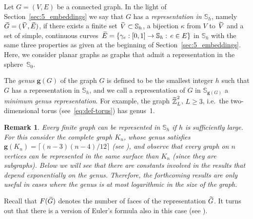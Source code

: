 \documentclass{dis}
\newtheorem{remark}[theorem]{Remark}
\theoremstyle{citing}
\begin{document}
Let $G=(V,E)$ be a connected graph. 
In the light of Section~\ref{sec:5_embeddings} we say 
that $G$ has a \emph{representation in ${\ensuremath{\mathbb{S}}}_h$}, 
namely ${\,\raisebox{2pt}{ ${\widetilde{{}}}$ }\mkern-15mu G}=({\,\raisebox{2pt}{ ${\widetilde{{}}}$ }\mkern-13mu V},{\,\raisebox{2pt}{ ${\widetilde{{}}}$ }\mkern-15mu E})$, 
if there exists a finite set ${\,\raisebox{2pt}{ ${\widetilde{{}}}$ }\mkern-13mu V}\subset{\ensuremath{\mathbb{S}}}_h$, 
a bijection $\kappa$ from $V$ to ${\,\raisebox{2pt}{ ${\widetilde{{}}}$ }\mkern-13mu V}$ 
and a set of simple, continuous curves
$\,{\,\raisebox{2pt}{ ${\widetilde{{}}}$ }\mkern-15mu E}=\{{\gamma}_e:[0,1]\to{\ensuremath{\mathbb{S}}}_h:\, e\in E\}$ in ${\ensuremath{\mathbb{S}}}_h$ 
with the same three properties as given at the beginning of 
Section~\ref{sec:5_embeddings}. 
Here, we consider planar graphs as graphs 
that admit a representation in the sphere~${\ensuremath{\mathbb{S}}}_0$.

The \emph{genus} 
${\ensuremath{\mathbf{g}}}(G)$ of the graph $G$ 
is defined to be the smallest integer $h$ such that 
$G$ has a representation in ${\ensuremath{\mathbb{S}}}_h$, and we call a 
representation of $G$ in ${\ensuremath{\mathbb{S}}}_{{\ensuremath{\mathbf{g}}}(G)}$ a 
\emph{minimum genus representation}. 
For example, the graph ${\raisebox{2pt}{ ${\widetilde{{}}}$ }\mkern-12mu {\ensuremath{\mathbb{Z}}}}_L^2$, $L\ge3$, 
i.e.~the two-dimensional torus 
(see~\eqref{eq:def-torus}) has genus~1.

\begin{remark}
Every finite graph can be represented in ${\ensuremath{\mathbb{S}}}_h$ 
if $h$ is sufficiently large. For this consider the 
complete graph $K_n$, whose genus satisfies
${\ensuremath{\mathbf{g}}}(K_n)=\lceil{(n-3)(n-4)}/{12}\rceil$ 
(see \cite{Ringel-Youngs}), 
and observe that 
every graph on $n$ vertices can be represented in 
the same surface than $K_n$ (since they are subgraphs). 
Below we will see that there are constants involved 
in the results that depend exponentially on the 
genus. Therefore, the forthcoming results are only useful in 
cases where 
the genus is at most logarithmic in the size of the graph.
\end{remark}
 
Recall that $F({\,\raisebox{2pt}{ ${\widetilde{{}}}$ }\mkern-15mu G})$ denotes the number of faces 
of the representation ${\,\raisebox{2pt}{ ${\widetilde{{}}}$ }\mkern-15mu G}$.
It turns out that there is a version of 
Euler's formula also in this case 
(see \cite[eq.~(3.7)]{Mohar}). 
\end{document}
